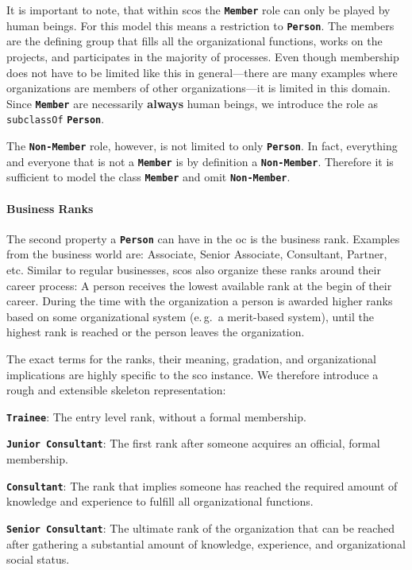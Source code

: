 \documentclass[a4paper, DIV=13, BCOR=0cm]{scrbook}
\newcommand{\eg}{e.\,g.\ }
\newcommand{\class}[1]{\texttt{\textbf{#1}}}
\newcommand{\relation}[1]{\texttt{#1}}
\begin{document}
It is important to note, that within \glspl{sco} the \class{Member} role can only be played by human beings. For this model this means a restriction to \class{Person}. The members are the defining group that fills all the organizational functions, works on the projects, and participates in the majority of processes. Even though membership does not have to be limited like this in general---there are many examples where organizations are members of other organizations---it is limited in this domain. Since \class{Member} are necessarily \textbf{always} human beings, we introduce the role as \relation{subclassOf} \class{Person}.

The \class{Non-Member} role, however, is not limited to only \class{Person}. In fact, everything and everyone that is not a \class{Member} is by definition a \class{Non-Member}. Therefore it is sufficient to model the class \class{Member} and omit \class{Non-Member}.

\paragraph{Business Ranks}
\label{ranks}
The second property a \class{Person} can have in the \gls{oc} is the business rank. Examples from the business world are: Associate, Senior Associate, Consultant, Partner, etc. Similar to regular businesses, \glspl{sco} also organize these ranks around their career process: A person receives the lowest available rank at the begin of their career. During the time with the organization a person is awarded higher ranks based on some organizational system (\eg a merit-based system), until the highest rank is reached or the person leaves the organization.

The exact terms for the ranks, their meaning, gradation, and organizational implications are highly specific to the \gls{sco} instance. We therefore introduce a rough and extensible skeleton representation:
\begin{compactenum}
	\item \class{Trainee}: The entry level rank, without a formal membership.
	\item \class{Junior Consultant}: The first rank after someone acquires an official, formal membership.
	\item \class{Consultant}: The rank that implies someone has reached the required amount of knowledge and experience to fulfill all organizational functions.
	\item \class{Senior Consultant}: The ultimate rank of the organization that can be reached after gathering a substantial amount of knowledge, experience, and organizational social status.
\end{compactenum}
\end{document}
